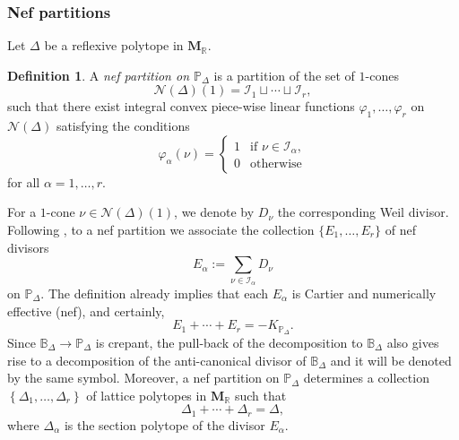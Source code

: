 \documentclass[12pt,a4paper,oneside]{amsart}
\numberwithin{equation}{section}
\theoremstyle{definition}
\newtheorem{defin}[thm]{Definition}
\theoremstyle{remark}
\DeclareMathOperator{\R}{\mathbb{R}}
\newcommand{\cP}{\mathbb{P}}
\newcommand{\cB}{\mathbb{B}}
\newcommand{\bM}{\mathbf{M}}
\begin{document}
\subsubsection{Nef partitions}
\label{sec:nefpartition}
Let \(\Delta\) be a 
reflexive polytope in \(\mathbf{M}_{\mathbb{R}}\).
\begin{defin}\label{def:BBnef}
A \emph{nef partition on $\cP_{\Delta}$} is a partition of the set of \(1\)-cones
\begin{equation*}
\mathcal{N}(\Delta)(1)= \mathcal{I}_1 \sqcup \cdots \sqcup \mathcal{I}_r ,
\end{equation*}
such that there exist integral convex piece-wise 
linear functions $\varphi_1, \dots, \varphi_r$ on $\mathcal{N}(\Delta)$ satisfying the conditions
\begin{equation}
\label{eq:Borisovphi}
	\varphi_{\alpha} \left(  \nu \right) = \begin{cases} 1 & \text{if } \nu \in \mathcal{I}_{\alpha}, \\ 0 & \text{otherwise} \end{cases}
\end{equation}
for all \(\alpha=1,\ldots,r\).
\end{defin}
For a \(1\)-cone \(\nu\in\mathcal{N}(\Delta)(1)\), we denote by \(D_{\nu}\) the 
corresponding Weil divisor.
Following \cite{Borisov:1993mirror}, to a nef partition we associate the 
collection $\{E_1, \dots, E_r\}$ of nef divisors 
\begin{equation*}
	E_{\alpha} := \sum_{\nu \in \mathcal{I}_{\alpha}} D_{\nu} 
\end{equation*}
on \(\mathbb{P}_{\Delta}\).
The definition already implies that 
each \(E_{\alpha}\) is Cartier and numerically effective (nef), and
certainly,
\begin{equation*}
    E_{1}+\cdots+E_{r}=-K_{\mathbb{P}_{\Delta}}.
\end{equation*}
Since \(\mathbb{B}_{\Delta}\to \mathbb{P}_{\Delta}\) is crepant,
the pull-back of the decomposition to $\cB_{\Delta}$ also gives
rise to a decomposition of the anti-canonical divisor of \(\mathbb{B}_{\Delta}\)
and it will be denoted by the same symbol.
Moreover, a nef partition on $\cP_{\Delta}$ determines a 
collection $\left\{ \Delta_1, \dots ,\Delta_r \right\}$ of lattice polytopes in \(\bM_{\R}\) such that
\begin{equation*}
	\Delta_1 + \cdots + \Delta_r = \Delta,
\end{equation*}
where \(\Delta_{\alpha}\) is the section
polytope of the divisor \(E_{\alpha}\).
\end{document}
